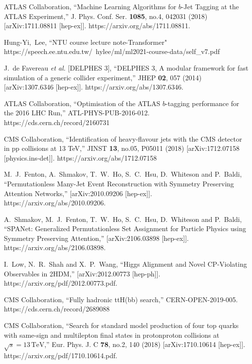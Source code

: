 \begin{thebibliography}{99}
ATLAS Collaboration,
``Machine Learning Algorithms for $b$-Jet Tagging at the ATLAS Experiment,''
J. Phys. Conf. Ser. \textbf{1085}, no.4, 042031 (2018)
[arXiv:1711.08811 [hep-ex]].
https://arxiv.org/abs/1711.08811.

Hung-Yi,~Lee,
``NTU course lecture note-Transformer"
https://speech.ee.ntu.edu.tw/~hylee/ml/ml2021-course-data/self\_v7.pdf

J.~de Favereau \textit{et al.} [DELPHES 3],
``DELPHES 3, A modular framework for fast simulation of a generic collider experiment,''
JHEP \textbf{02}, 057 (2014)
[arXiv:1307.6346 [hep-ex]].
https://arxiv.org/abs/1307.6346.

ATLAS Collaboration,
``Optimisation of the ATLAS $b$-tagging performance for the 2016 LHC Run,''
ATL-PHYS-PUB-2016-012.
https://cds.cern.ch/record/2160731

CMS Collaboration,
``Identification of heavy-flavour jets with the CMS detector in pp collisions at 13 TeV,''
JINST \textbf{13}, no.05, P05011 (2018)
[arXiv:1712.07158 [physics.ins-det]].
https://arxiv.org/abs/1712.07158

M.~J.~Fenton, A.~Shmakov, T.~W.~Ho, S.~C.~Hsu, D.~Whiteson and P.~Baldi,
``Permutationless Many-Jet Event Reconstruction with Symmetry Preserving Attention Networks,''
[arXiv:2010.09206 [hep-ex]].
https://arxiv.org/abs/2010.09206.

A.~Shmakov, M.~J.~Fenton, T.~W.~Ho, S.~C.~Hsu, D.~Whiteson and P.~Baldi,
``SPANet: Generalized Permutationless Set Assignment for Particle Physics using Symmetry Preserving Attention,''
[arXiv:2106.03898 [hep-ex]].
https://arxiv.org/abs/2106.03898.

I.~Low, N.~R.~Shah and X.~P.~Wang,
``Higgs Alignment and Novel CP-Violating Observables in 2HDM,''
[arXiv:2012.00773 [hep-ph]].
https://arxiv.org/pdf/2012.00773.pdf.

CMS Collaboration,
``Fully hadronic ttH(bb) search,''
CERN-OPEN-2019-005.
https://cds.cern.ch/record/2689088

CMS Collaboration,
``Search for standard model production of four top quarks with same-sign and multilepton final states in proton\textendash{}proton collisions at $\sqrt{s} = 13\,\text {TeV} $,''
Eur. Phys. J. C \textbf{78}, no.2, 140 (2018)
[arXiv:1710.10614 [hep-ex]].
https://arxiv.org/pdf/1710.10614.pdf.

\end{thebibliography}
\newpage
